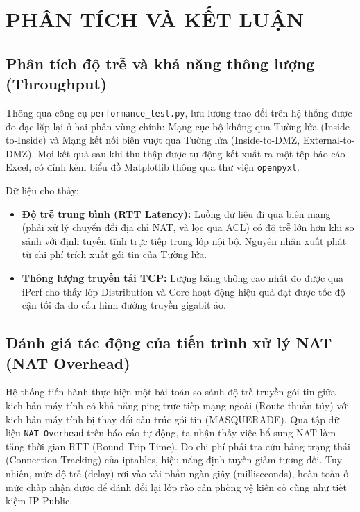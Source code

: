 \section{PHÂN TÍCH VÀ KẾT LUẬN}

\subsection{Phân tích độ trễ và khả năng thông lượng (Throughput)}
Thông qua công cụ \texttt{performance\_test.py}, lưu lượng trao đổi trên hệ thống được đo đạc lặp lại ở hai phân vùng chính: Mạng cục bộ không qua Tường lửa (Inside-to-Inside) và Mạng kết nối biên vượt qua Tường lửa (Inside-to-DMZ, External-to-DMZ). Mọi kết quả sau khi thu thập được tự động kết xuất ra một tệp báo cáo Excel, có đính kèm biểu đồ Matplotlib thông qua thư viện \texttt{openpyxl}.


Dữ liệu cho thấy:
\begin{itemize}
    \item \textbf{Độ trễ trung bình (RTT Latency):} Luồng dữ liệu đi qua biên mạng (phải xử lý chuyển đổi địa chỉ NAT, và lọc qua ACL) có độ trễ lớn hơn khi so sánh với định tuyến tĩnh trực tiếp trong lớp nội bộ. Nguyên nhân xuất phát từ chi phí trích xuất gói tin của Tường lửa.
    \item \textbf{Thông lượng truyền tải TCP:} Lượng băng thông cao nhất đo được qua iPerf cho thấy lớp Distribution và Core hoạt động hiệu quả đạt được tốc độ cận tối đa do cấu hình đường truyền gigabit ảo. 
\end{itemize}

\subsection{Đánh giá tác động của tiến trình xử lý NAT (NAT Overhead)}
Hệ thống tiến hành thực hiện một bài toán so sánh độ trễ truyền gói tin giữa kịch bản máy tính có khả năng ping trực tiếp mạng ngoài (Route thuần túy) với kịch bản máy tính bị thay đổi cấu trúc gói tin (MASQUERADE).
Qua tập dữ liệu \texttt{NAT\_Overhead} trên báo cáo tự động, ta nhận thấy việc bổ sung NAT làm tăng thời gian RTT (Round Trip Time). Do chi phí phải tra cứu bảng trạng thái (Connection Tracking) của iptables, hiệu năng định tuyến giảm tương đối. Tuy nhiên, mức độ trễ (delay) rơi vào vài phần ngàn giây (milliseconds), hoàn toàn ở mức chấp nhận được để đánh đổi lại lớp rào cản phòng vệ kiên cố cũng như tiết kiệm IP Public.


